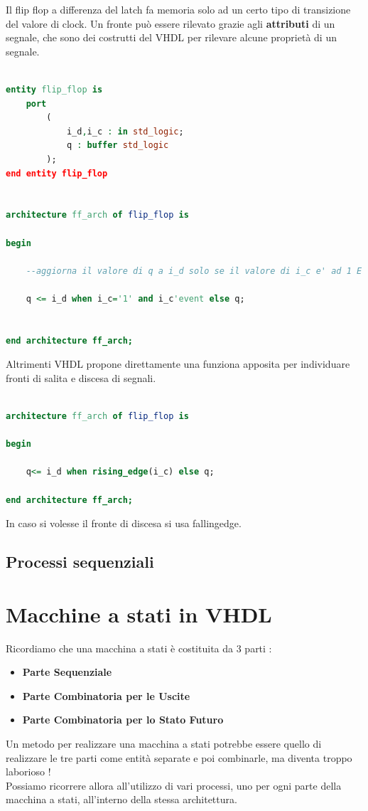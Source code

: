 \documentclass[a4paper]{book}
\begin{document}
Il flip flop a differenza del latch fa memoria solo ad un certo tipo di transizione del valore di clock.
Un fronte può essere rilevato grazie agli \textbf{attributi} di un segnale, che sono dei costrutti del VHDL per rilevare alcune proprietà di un segnale.


\begin{lstlisting}[language=VHDL]

entity flip_flop is
	port
		(
			i_d,i_c : in std_logic;
			q : buffer std_logic 
		);
end entity flip_flop


architecture ff_arch of flip_flop is

begin

	--aggiorna il valore di q a i_d solo se il valore di i_c e' ad 1 E il clock ha anche appena avuto un evento, quindi e' un fronte di salita.

	q <= i_d when i_c='1' and i_c'event else q;


end architecture ff_arch;


\end{lstlisting}
Altrimenti VHDL propone direttamente una funziona apposita per individuare fronti di salita e discesa di segnali.

\begin{lstlisting}[language =VHDL]

architecture ff_arch of flip_flop is

begin

	q<= i_d when rising_edge(i_c) else q;

end architecture ff_arch;
\end{lstlisting}
In caso si volesse il fronte di discesa si usa falling\textunderscore edge.



\subsection*{Processi sequenziali}



\section{Macchine a stati in VHDL}

Ricordiamo che una macchina a stati è costituita da 3 parti :

\begin{itemize}
\item \textbf{Parte Sequenziale}
\item \textbf{Parte Combinatoria per le Uscite}
\item \textbf{Parte Combinatoria per lo Stato Futuro}
\end{itemize}
Un metodo per realizzare una macchina a stati potrebbe essere quello di realizzare le tre parti come entità separate e poi combinarle, ma diventa troppo laborioso !\\
Possiamo ricorrere allora all'utilizzo di vari processi, uno per ogni parte della macchina a stati, all'interno della stessa architettura.
\end{document}
